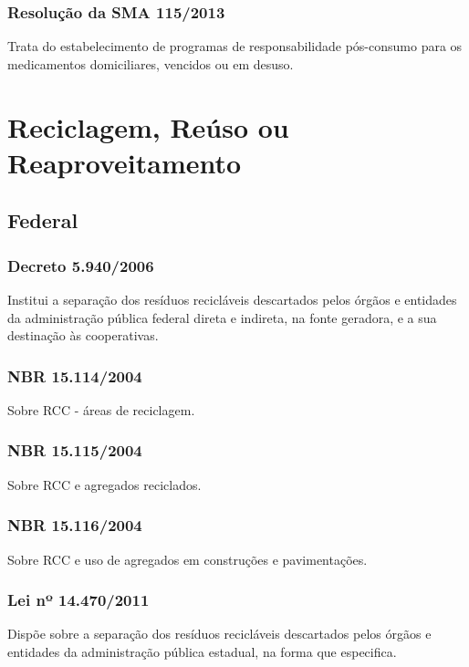 \begin{subapend}
\begin{subsubapend}
		\subsubsection{Resolução da SMA 115/2013}
		Trata do estabelecimento de programas de responsabilidade pós-consumo para os medicamentos domiciliares, vencidos ou em desuso.
	\end{subsubapend}
\end{subapend}

\section{Reciclagem, Reúso ou Reaproveitamento}

\begin{subapend}
	\subsection{Federal}
	\begin{subsubapend}
		\item \subsubsection{Decreto 5.940/2006}
		Institui a separação dos resíduos recicláveis descartados pelos órgãos e entidades da administração pública federal direta e indireta, na fonte geradora, e a sua destinação às cooperativas.
		\subsubsection{NBR 15.114/2004}
		Sobre RCC - áreas de reciclagem.
		\subsubsection{NBR 15.115/2004}
		Sobre RCC e agregados reciclados.
		\subsubsection{NBR 15.116/2004}
		Sobre RCC e uso de agregados em construções e pavimentações.
		\subsubsection{Lei nº 14.470/2011}
		Dispõe sobre a separação dos resíduos recicláveis descartados pelos órgãos e entidades da administração pública estadual, na forma que especifica.
	\end{subsubapend}
\end{subapend}



